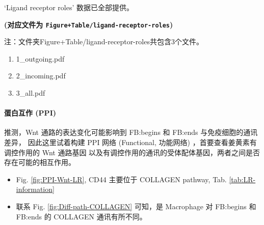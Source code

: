 \documentclass[
]{article}
\providecommand{\tightlist}{%
  \setlength{\itemsep}{0pt}\setlength{\parskip}{0pt}}
\begin{document}
`Ligand receptor roles' 数据已全部提供。

\textbf{(对应文件为 \texttt{Figure+Table/ligand-receptor-roles})}

\begin{center}\begin{tcolorbox}[colback=gray!10, colframe=gray!50, width=0.9\linewidth, arc=1mm, boxrule=0.5pt]注：文件夹Figure+Table/ligand-receptor-roles共包含3个文件。

\begin{enumerate}\tightlist
\item 1\_outgoing.pdf
\item 2\_incoming.pdf
\item 3\_all.pdf
\end{enumerate}\end{tcolorbox}
\end{center}

\hypertarget{ux86cbux767dux4e92ux4f5c-ppi}{%
\paragraph{蛋白互作 (PPI)}\label{ux86cbux767dux4e92ux4f5c-ppi}}

推测，Wnt 通路的表达变化可能影响到 FB:begins 和 FB:ends 与免疫细胞的通讯差异，
因此这里试着构建 PPI 网络 (Functional, 功能网络) ，首要查看姜黄素有调控作用的 Wnt 通路基因
以及有调控作用的通讯的受体配体基因，两者之间是否存在可能的相互作用。

\begin{itemize}
\tightlist
\item
  Fig. \ref{fig:PPI-Wnt-LR}, CD44 主要位于 COLLAGEN pathway, Tab. \ref{tab:LR-information}
\item
  联系 Fig. \ref{fig:Diff-path-COLLAGEN} 可知，是 Macrophage 对 FB:begins 和 FB:ends 的 COLLAGEN 通讯有所不同。
\end{itemize}
\end{document}
